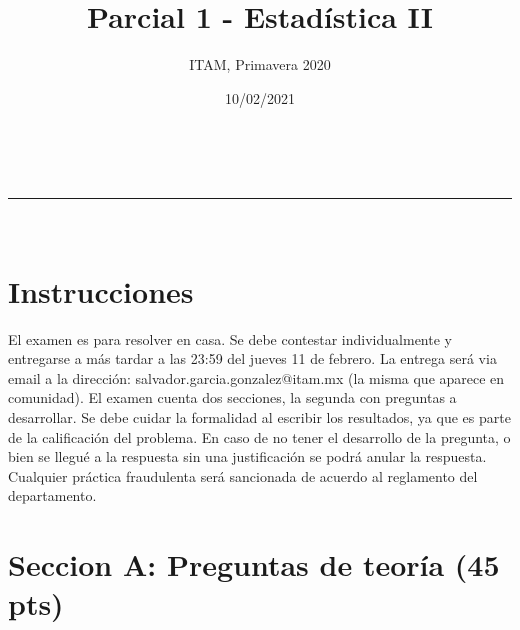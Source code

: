 \documentclass[addpoints]{exam}
\makeatletter
\newcommand{\linia}{\rule{\linewidth}{0.5pt}}
\theoremstyle{mytheor}
\renewcommand{\maketitle}{
    \begin{center}
    \vspace{2ex}
    {\huge \textsc{\@title}}
    \vspace{1ex}
    \\
    \linia\\
    \@author \hfill \@date
    \vspace{4ex}
    \end{center}
  }
\makeatother
\begin{document}
  
  \title{Parcial 1 - Estadística II}
  
  \author{ITAM, Primavera 2020}
  
  \date{10/02/2021}
  
  \maketitle
  
  \section*{Instrucciones}
  
El examen es para resolver en casa. Se debe contestar individualmente y entregarse a más tardar a las 23:59 del jueves 11 de febrero. La entrega será via email a la dirección: salvador.garcia.gonzalez@itam.mx (la misma que aparece en comunidad). El examen cuenta dos secciones, la segunda con   preguntas a desarrollar. Se debe cuidar la formalidad al escribir los resultados, ya que es parte de la calificación del problema. En caso de no tener el desarrollo de la pregunta, o bien se llegué a la respuesta sin una justificación se podrá anular la respuesta. Cualquier práctica fraudulenta será sancionada de acuerdo al reglamento del departamento. 
  
  \section*{Seccion A: Preguntas de teoría (45 pts)}
  
\end{document}
